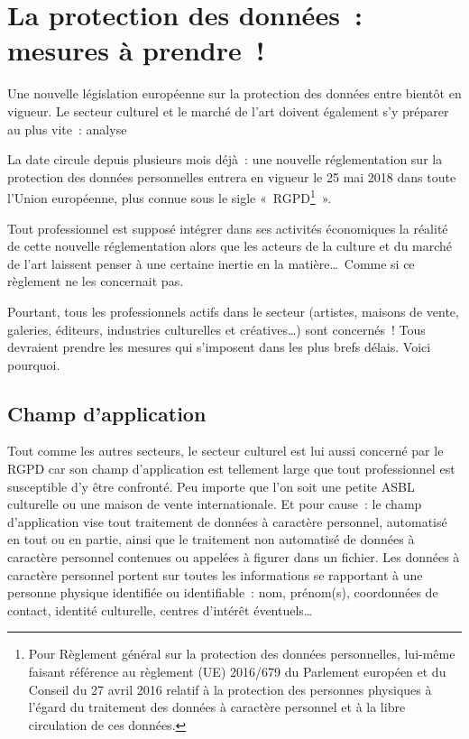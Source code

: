 \documentclass[11pt, french]{article}
\begin{document}
\vfill

\section{La protection des données~: mesures à prendre~!}

Une nouvelle législation européenne sur la protection des données
entre bientôt en vigueur. Le secteur culturel et le marché de l'art
doivent également s'y préparer au plus vite~: analyse

La date circule depuis plusieurs mois déjà~: une nouvelle
réglementation sur la protection des données personnelles entrera en
vigueur le 25 mai 2018 dans toute l'Union européenne, plus connue sous
le sigle «~RGPD\footnote{Pour Règlement général sur la protection des
  données personnelles, lui-même faisant référence au règlement (UE)
  2016/679 du Parlement européen et du Conseil du 27 avril 2016
  relatif à la protection des personnes physiques à l'égard du
  traitement des données à caractère personnel et à la libre
  circulation de ces données.}~».

Tout professionnel est supposé intégrer dans ses activités économiques
la réalité de cette nouvelle réglementation alors que les acteurs de
la culture et du marché de l'art laissent penser à une certaine
inertie en la matière\ldots\ Comme si ce règlement ne les concernait
pas.

Pourtant, tous les professionnels actifs dans le secteur (artistes,
maisons de vente, galeries, éditeurs, industries culturelles et
créatives\ldots) sont concernés~! Tous devraient prendre les mesures
qui s'imposent dans les plus brefs délais. Voici pourquoi.

\subsection{Champ d'application}

Tout comme les autres secteurs, le secteur culturel est lui aussi
concerné par le RGPD car son champ d'application est tellement large
que tout professionnel est susceptible d'y être confronté. Peu importe
que l'on soit une petite ASBL culturelle ou une maison de vente
internationale. Et pour cause~: le champ d'application vise tout
traitement de données à caractère personnel, automatisé en tout ou en
partie, ainsi que le traitement non automatisé de données à caractère
personnel contenues ou appelées à figurer dans un fichier. Les données
à caractère personnel portent sur toutes les informations se
rapportant à une personne physique identifiée ou identifiable~: nom,
prénom(s), coordonnées de contact, identité culturelle, centres
d'intérêt éventuels\ldots
\end{document}
